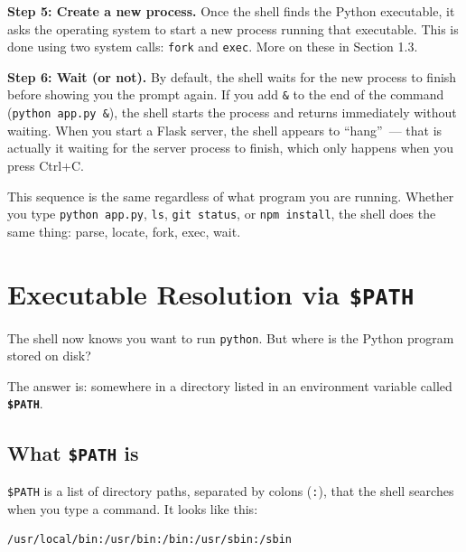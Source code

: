 \textbf{Step 5: Create a new process.} Once the shell finds the Python executable, it asks the operating system to start a new process running that executable. This is done using two system calls: \texttt{fork} and \texttt{exec}. More on these in Section 1.3.

\textbf{Step 6: Wait (or not).} By default, the shell waits for the new process to finish before showing you the prompt again. If you add \texttt{\&} to the end of the command (\texttt{python\ app.py\ \&}), the shell starts the process and returns immediately without waiting. When you start a Flask server, the shell appears to ``hang''~--- that is actually it waiting for the server process to finish, which only happens when you press Ctrl+C.

This sequence is the same regardless of what program you are running. Whether you type \texttt{python\ app.py}, \texttt{ls}, \texttt{git\ status}, or \texttt{npm\ install}, the shell does the same thing: parse, locate, fork, exec, wait.

\setcounter{section}{1}
\section{\texorpdfstring{Executable Resolution via \texttt{\$PATH}}{Executable Resolution via \$PATH}}\label{01-command-to-process:12-executable-resolution-via-path}

The shell now knows you want to run \texttt{python}. But where is the Python program stored on disk?

The answer is: somewhere in a directory listed in an environment variable called \textbf{\texttt{\$PATH}}.

\subsection*{\texorpdfstring{What \texttt{\$PATH} is}{What \$PATH is}}\label{01-command-to-process:what-path-is}

\texttt{\$PATH} is a list of directory paths, separated by colons (\texttt{:}), that the shell searches when you type a command. It looks like this:

\begin{outputbox}[short]
\begin{Verbatim}[fontsize=\codesize, breaklines, breakanywhere, breaksymbolleft={\tiny\textcolor{muted}{$\hookrightarrow$}}]
/usr/local/bin:/usr/bin:/bin:/usr/sbin:/sbin
\end{Verbatim}
\end{outputbox}

